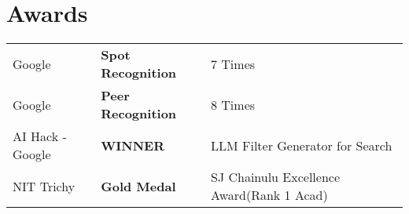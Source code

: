 \documentclass[]{deedy-resume-openfont}
\begin{document}
\begin{minipage}[t]{0.66\textwidth}




\section{Awards} 
\begin{tabular}{lll}
Google         & \bf Spot Recognition & 7 Times\\
Google         & \bf Peer Recognition  & 8 Times\\
AI Hack - Google         & \bf WINNER  & LLM Filter Generator for Search\\
NIT Trichy         & \bf Gold Medal  & SJ Chainulu Excellence Award(Rank 1 Acad)\\
\end{tabular}
\sectionsep

\end{minipage} 
\end{document}
